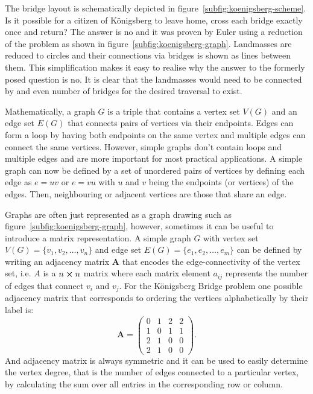 %
The bridge layout is schematically depicted in
figure~\ref{subfig:koenigsberg-scheme}. Is it possible for a citizen of
K\"onigsberg to leave home, cross each bridge exactly once and return? The
answer is no and it was proven by Euler using a reduction of the problem as
shown in figure~\ref{subfig:koenigsberg-graph}. Landmasses are reduced to
circles and their connections via bridges is shown as lines between them. This
simplification makes it easy to realise why the answer to the formerly posed
question is no. It is clear that the landmasses would need to be connected by
and even number of bridges for the desired traversal to exist.

Mathematically, a graph $G$ is a triple that contains a vertex set $V(G)$ and
an edge set $E(G)$ that connects pairs of vertices via their endpoints. Edges
can form a loop by having both endpoints on the same vertex and multiple edges
can connect the same vertices. However, simple graphs don't contain loops and
multiple edges and are more important for most practical applications. A simple
graph can now be defined by a set of unordered pairs of vertices by defining
each edge as $e=uv$ or $e=vu$ with $u$ and $v$ being the endpoints (or
vertices) of the edges. Then, neighbouring or adjacent vertices are those that
share an edge.

Graphs are often just represented as a graph drawing such as
figure~\ref{subfig:koenigsberg-graph}, however, sometimes it can be useful to
introduce a matrix representation. A simple graph $G$ with vertex set
$V(G)=\{v_1,v_2,\dots,v_n\}$ and edge set $E(G)=\{e_1,e_2,\dots,e_m\}$ can be
defined by writing an adjacency matrix $\mathbf{A}$ that encodes the
edge-connectivity of the vertex set, i.e. $A$ is a $n\cross n$ matrix where
each matrix element $a_{ij}$ represents the number of edges that connect $v_i$
and $v_j$. For the K\"onigsberg Bridge problem one possible adjacency matrix
that corresponds to ordering the vertices alphabetically by their label is:
%
\begin{equation}
    \mathbf{A}=
    \begin{pmatrix}
         0 & 1 & 2 & 2\\
         1 & 0 & 1 & 1\\
         2 & 1 & 0 & 0\\
         2 & 1 & 0 & 0
    \end{pmatrix}.
\end{equation}
%
And adjacency matrix is always symmetric and it can be used to easily determine
the vertex degree, that is the number of edges connected to a particular
vertex, by calculating the sum over all entries in the corresponding row or
column. 


